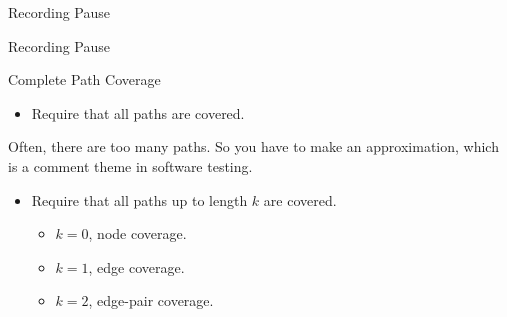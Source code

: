 \documentclass[handout]{beamer}
\newcommand{\recordingpause}{
\begin{frame}{Recording Pause}
  \begin{center}
    Recording Pause
  \end{center}
\end{frame}
}
\begin{document}
\recordingpause

\begin{frame}{Complete Path Coverage}
  \begin{itemize}
  \item Require that all paths are covered.
  \end{itemize}
  Often, there are too many paths. So you have to make an
  approximation, which is a comment theme in software testing.
  \begin{itemize}
  \item Require that all paths up to length $k$ are covered.
    \begin{itemize}
    \item $k=0$, node coverage.
    \item $k=1$, edge coverage.
    \item $k=2$, edge-pair coverage.
    \end{itemize}
  \end{itemize}
\end{frame}
\end{document}
